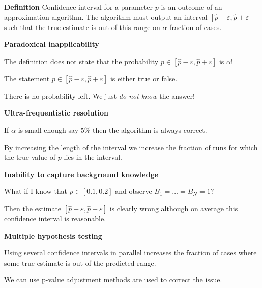 \documentclass[landscape,footrule]{foils}
\begin{document}

\textbf{Definition}
Confidence interval for a parameter $p$ is an outcome of an approximation algorithm. The algorithm  must output an interval $[\hat{p}-\varepsilon,\hat{p}+\varepsilon]$ such that the true estimate is out of this range on $\alpha$  fraction of cases.
\vspace*{2ex}

\textbf{Paradoxical inapplicability}

The definition does not state that the probability $p\in[\hat{p}-\varepsilon,\hat{p}+\varepsilon]$ is $\alpha$!
\begin{triangles}
\item The statement $p\in[\hat{p}-\varepsilon,\hat{p}+\varepsilon]$ is either true or false.
\item There is no probability left. We just \emph{do not know} the answer!
\end{triangles} 
\vspace*{3ex}

\textbf{Ultra-frequentistic resolution}
\begin{triangles}
\item  If $\alpha$ is small enough say $5\%$ then the algorithm is always correct. 
\end{triangles}




By increasing the length of the interval we increase the fraction of runs for which the true value of $p$ lies in the interval.



\textbf{Inability to capture background knowledge}
\begin{triangles}
\item What if I know that $p\in[0.1,0.2]$ and observe $B_1=\ldots=B_N=1$?
\item Then the estimate $[\hat{p}-\varepsilon,\hat{p}+\varepsilon]$  is clearly wrong although on average this confidence interval is reasonable.
\end{triangles}
\vspace*{2cm}


\textbf{Multiple hypothesis testing}

\begin{triangles}
\item Using several confidence intervals in parallel increases the fraction of cases where some true estimate is out of the predicted range.
\item We can use p-value adjustment methods are used to correct the issue.
\end{triangles}  
\end{document}
